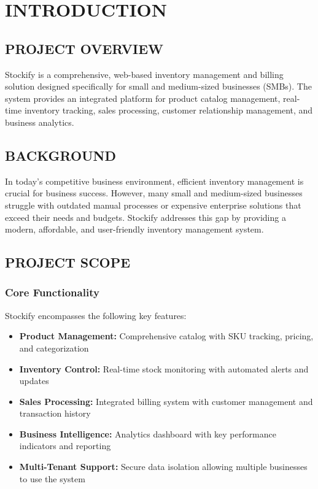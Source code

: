 \chapter{INTRODUCTION}

\section{PROJECT OVERVIEW}

Stockify is a comprehensive, web-based inventory management and billing solution designed specifically for small and medium-sized businesses (SMBs). The system provides an integrated platform for product catalog management, real-time inventory tracking, sales processing, customer relationship management, and business analytics.

\section{BACKGROUND}

In today's competitive business environment, efficient inventory management is crucial for business success. However, many small and medium-sized businesses struggle with outdated manual processes or expensive enterprise solutions that exceed their needs and budgets. Stockify addresses this gap by providing a modern, affordable, and user-friendly inventory management system.

\section{PROJECT SCOPE}

\subsection{Core Functionality}
Stockify encompasses the following key features:

\begin{itemize}
\item \textbf{Product Management:} Comprehensive catalog with SKU tracking, pricing, and categorization
\item \textbf{Inventory Control:} Real-time stock monitoring with automated alerts and updates
\item \textbf{Sales Processing:} Integrated billing system with customer management and transaction history
\item \textbf{Business Intelligence:} Analytics dashboard with key performance indicators and reporting
\item \textbf{Multi-Tenant Support:} Secure data isolation allowing multiple businesses to use the system
\end{itemize}

